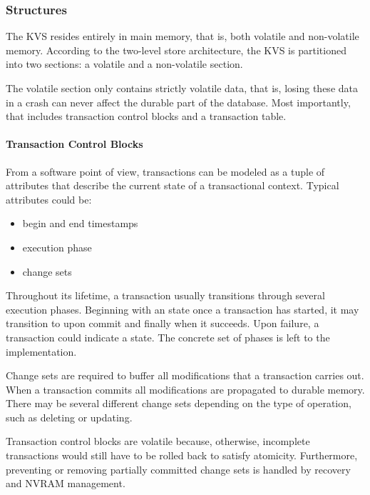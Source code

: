 \subsubsection{Structures}

The KVS resides entirely in main memory, that is, both volatile and non-volatile
memory. According to the two-level store architecture, the KVS is partitioned
into two sections: a volatile and a non-volatile section.

The volatile section only contains strictly volatile data, that is, losing these
data in a crash can never affect the durable part of the database. Most
importantly, that includes transaction control blocks and a transaction table.

\paragraph{Transaction Control Blocks}

From a software point of view, transactions can be modeled as a tuple of
attributes that describe the current state of a transactional context. Typical
attributes could be:

\begin{itemize}
    \item begin and end timestamps
    \item execution phase
    \item change sets
\end{itemize}

Throughout its lifetime, a transaction usually transitions through several
execution phases. Beginning with an  state once a transaction has
started, it may transition to  upon commit and finally
 when it succeeds. Upon failure, a transaction could indicate a
 state. The concrete set of phases is left to the implementation.

Change sets are required to buffer all modifications that a transaction carries
out. When a transaction commits all modifications are propagated to durable
memory. There may be several different change sets depending on the type of
operation, such as deleting or updating.

Transaction control blocks are volatile because, otherwise, incomplete
transactions would still have to be rolled back to satisfy atomicity.
Furthermore, preventing or removing partially committed change sets is handled
by recovery and NVRAM management.

